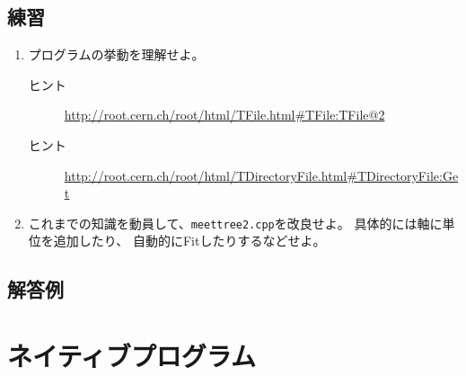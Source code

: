 \documentclass{jarticle}
\begin{document}
  \subsection{練習}
  \begin{enumerate}
   \item プログラムの挙動を理解せよ。
	 \begin{description}
	  \item[ヒント] \url{http://root.cern.ch/root/html/TFile.html#TFile:TFile@2}
	  \item[ヒント] \url{http://root.cern.ch/root/html/TDirectoryFile.html#TDirectoryFile:Get}
	 \end{description}
   \item これまでの知識を動員して、\verb|meettree2.cpp|を改良せよ。
	 具体的には軸に単位を追加したり、
	 自動的にFitしたりするなどせよ。
  \end{enumerate}

  \subsection{解答例}


 \section{ネイティブプログラム}


 \clearpage

 \appendix

\end{document}
